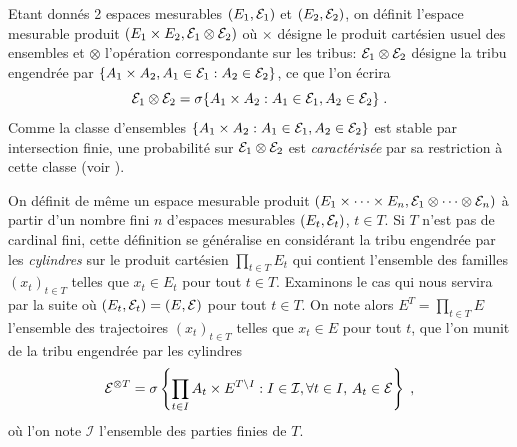 Etant donn\'es 2 espaces mesurables $(E_1,\mathcal{E}_1)$ et $(E_2,\mathcal{E}_2)$, on d\'efinit l'espace mesurable produit
$(E_1\times E_2,\mathcal{E}_1\otimes\mathcal{E}_2)$ o\`u $\times$ d\'esigne le produit cart\'esien usuel des ensembles
et $\otimes$ l'op\'eration correspondante sur les tribus: $\mathcal{E}_1\otimes\mathcal{E}_2$ d\'esigne la tribu engendr\'ee par $\{A_1\times A_2,
A_1\in\mathcal{E}_1: A_2\in\mathcal{E}_2\}$, ce que l'on \'ecrira
$$
\mathcal{E}_1\otimes\mathcal{E}_2=\sigma\{A_1\times A_2: A_1\in\mathcal{E}_1, A_2\in\mathcal{E}_2\} \; .
$$
Comme la classe d'ensembles $\{A_1\times A_2: A_1\in\mathcal{E}_1,
A_2\in\mathcal{E}_2\}$ est stable par intersection finie, une probabilit\'e sur
$\mathcal{E}_1\otimes\mathcal{E}_2$  est \emph{caract\'eris\'ee} par sa restriction \`a
cette classe (voir \cite[Corollaire 6.1]{jacod:protter:2003}).

On d\'efinit de m\^{e}me un espace mesurable produit $(E_1\times\dots\times E_n,\mathcal{E}_1\otimes\dots\otimes\mathcal{E}_n)$
\`a partir d'un nombre fini $n$ d'espaces mesurables $(E_t,\mathcal{E}_t)$,
$t\in T$. Si $T$ n'est pas de cardinal fini, cette d\'efinition se g\'en\'eralise en consid\'erant
 la tribu engendr\'ee par les \emph{cylindres} sur le produit cart\'esien $\prod_{t\in T} E_t$ qui contient l'ensemble des
 familles $(x_t)_{t\in T}$ telles que $x_t\in E_t$ pour tout $t\in T$. Examinons le cas qui nous servira par la suite o\`u
$(E_t,\mathcal{E}_t)=(E,\mathcal{E})$ pour tout $t\in T$. On note alors $E^T=\prod_{t\in T} E$ l'ensemble des trajectoires $(x_t)_{t\in T}$
telles que $x_t\in E$ pour tout $t$, que l'on munit de la tribu engendr\'ee par les cylindres
$$
\mathcal{E}^{\otimes T}=\sigma\left\{\prod_{t\in I}A_{t}\times E^{T\setminus I} : I\in\mathcal{I},\forall t\in I,\,A_t\in\mathcal{E}\right\}\;,
$$
o\`u l'on note $\mathcal{I}$ l'ensemble des parties finies de $T$.



